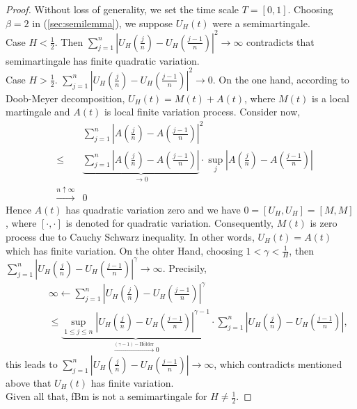 \documentclass[a4paper, twoside, 11pt]{article}
\theoremstyle{definition}
\begin{document}
\begin{proof}
  Without loss of generality, we set the time scale $T=[0, 1]$. Choosing $\beta=2$ in (\ref{sec:semilemma}), we suppose $U_H(t)$ were a semimartingale.\\
  Case $H < \frac{1}{2}$. Then $\sum_{j=1}^n |U_H(\frac{j}{n}) - U_H(\frac{j-1}{n})|^2\rightarrow\infty$ contradicts that semimartingale has finite quadratic variation.\\
  Case $H > \frac{1}{2}$. $\sum_{j=1}^n |U_H(\frac{j}{n}) - U_H(\frac{j-1}{n})|^2\rightarrow 0$. On the one hand, according to Doob-Meyer decomposition, $U_H(t) = M(t) + A(t)$, where $M(t)$ is a local martingale and $A(t)$ is local finite variation process. Consider now,
  \begin{eqnarray*}
	&&\sum_{j=1}^{n} |A(\frac{j}{n}) - A(\frac{j-1}{n})|^2\\
	&\le& \underbrace{\sum_{j=1}^{n} |A(\frac{j}{n}) - A(\frac{j-1}{n})|}_{\rightarrow 0} \cdot \sup\limits_{j} |A(\frac{j}{n}) - A(\frac{j-1}{n})|\\
	&\overset{n\uparrow \infty}{\rightarrow}& 0
  \end{eqnarray*}
  Hence $A(t)$ has quadratic variation zero and we have $0=[U_H, U_H] = [M, M] $, where $[\cdot,\cdot]$ is denoted for quadratic variation. Consequently, $M(t)$ is zero process due to Cauchy Schwarz inequality. In other words, $U_H(t)=A(t)$ which has finite variation. On the ohter Hand, choosing $1<\gamma<\frac{1}{H}$, then $\sum_{j=1}^n |U_H(\frac{j}{n}) - U_H(\frac{j-1}{n})|^\gamma \rightarrow \infty$. Precisily, 
  \begin{eqnarray*}
	 &&\infty \leftarrow \sum_{j=1}^n |U_H(\frac{j}{n}) - U_H(\frac{j-1}{n})|^\gamma\\
	 &\hspace{2em}&\le \underbrace{\sup\limits_{1\le j\le n}|U_H(\frac{j}{n}) - U_H(\frac{j-1}{n})|^{\gamma-1}}_{\overset{(\gamma-1)-\text{H\"older}}{\rightarrow}0} \cdot \sum_{j=1}^n|U_H(\frac{j}{n}) - U_H(\frac{j-1}{n})|,
  \end{eqnarray*}
  this leads to $\sum_{j=1}^n|U_H(\frac{j}{n}) - U_H(\frac{j-1}{n})|\rightarrow \infty$, which contradicts mentioned above that $U_H(t)$ has finite variation.\\
  Given all that, fBm is not a semimartingale for $H\neq \frac{1}{2}$.
\end{proof}
\end{document}
